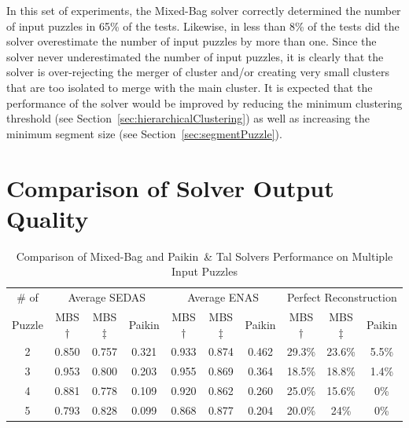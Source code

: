 In this set of experiments, the Mixed-Bag solver correctly determined the number of input puzzles in 65\% of the tests.  Likewise, in less than 8\% of the tests did the solver overestimate the number of input puzzles by more than one.  Since the solver never underestimated the number of input puzzles, it is clearly that the solver is over-rejecting the merger of cluster and/or creating very small clusters that are too isolated to merge with the main cluster.  It is expected that the performance of the solver would be improved by reducing the minimum clustering threshold (see Section~\ref{sec:hierarchicalClustering}) as well as increasing the minimum segment size (see Section~\ref{sec:segmentPuzzle}). 

\section{Comparison of Solver Output Quality}\label{sec:comparisonOfSolverOutputQuality}


\begin{table}[tb]
\begin{center}
\begin{tabular}{ c||c|c|c||c|c|c||c|c|c } 
 \toprule
 \# of & \multicolumn{3}{c||}{Average SEDAS} & \multicolumn{3}{c||}{Average ENAS} & \multicolumn{3}{c}{Perfect Reconstruction} \\ \cline{2-10}
 Puzzle & MBS$\dagger$ & MBS$\ddagger$ & Paikin & MBS$\dagger$ & MBS$\ddagger$ & Paikin & MBS$\dagger$ & MBS$\ddagger$ & Paikin \\ 
 \hline \hline
 
	2 & 0.850 & 0.757 & 0.321 & 0.933 & 0.874 & 0.462 & 29.3\% & 23.6\% & 5.5\% \\ \hline
 
	3 & 0.953 & 0.800 & 0.203 & 0.955 & 0.869 & 0.364 & 18.5\% & 18.8\% & 1.4\% \\ \hline
  
	4 & 0.881 & 0.778 & 0.109 & 0.920 & 0.862 & 0.260 & 25.0\% & 15.6\% & 0\% \\ \hline
  
	5 & 0.793 & 0.828 & 0.099 & 0.868 & 0.877 & 0.204 & 20.0\% & 24\% & 0\% \\ 
 \bottomrule
\end{tabular}
\end{center}
\caption{Comparison of Mixed-Bag and Paikin~\& Tal Solvers Performance on Multiple Input Puzzles}\label{tab:tableSolverPerformanceComparison}
\end{table}

